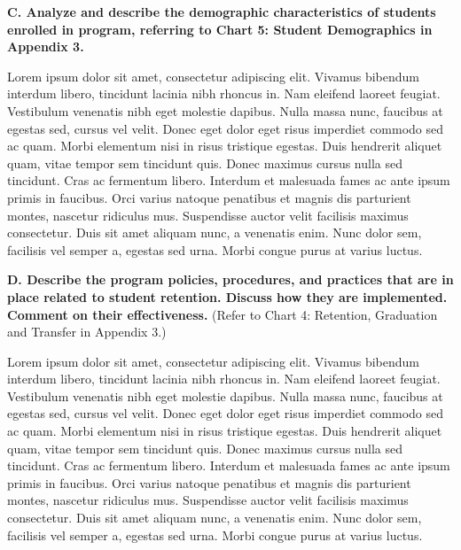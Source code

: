 \textbf{C. Analyze and describe the demographic characteristics of students enrolled in program, referring to Chart 5: Student Demographics in Appendix 3.}

Lorem ipsum dolor sit amet, consectetur adipiscing elit. Vivamus bibendum interdum libero, tincidunt lacinia nibh rhoncus in. Nam eleifend laoreet feugiat. Vestibulum venenatis nibh eget molestie dapibus. Nulla massa nunc, faucibus at egestas sed, cursus vel velit. Donec eget dolor eget risus imperdiet commodo sed ac quam. Morbi elementum nisi in risus tristique egestas. Duis hendrerit aliquet quam, vitae tempor sem tincidunt quis. Donec maximus cursus nulla sed tincidunt. Cras ac fermentum libero. Interdum et malesuada fames ac ante ipsum primis in faucibus. Orci varius natoque penatibus et magnis dis parturient montes, nascetur ridiculus mus. Suspendisse auctor velit facilisis maximus consectetur. Duis sit amet aliquam nunc, a venenatis enim. Nunc dolor sem, facilisis vel semper a, egestas sed urna. Morbi congue purus at varius luctus. 

\textbf{D. Describe the program policies, procedures, and practices that are in place related to student retention. Discuss how they are implemented. Comment on their effectiveness.}
(Refer to Chart 4: Retention, Graduation and Transfer in Appendix 3.)

Lorem ipsum dolor sit amet, consectetur adipiscing elit. Vivamus bibendum interdum libero, tincidunt lacinia nibh rhoncus in. Nam eleifend laoreet feugiat. Vestibulum venenatis nibh eget molestie dapibus. Nulla massa nunc, faucibus at egestas sed, cursus vel velit. Donec eget dolor eget risus imperdiet commodo sed ac quam. Morbi elementum nisi in risus tristique egestas. Duis hendrerit aliquet quam, vitae tempor sem tincidunt quis. Donec maximus cursus nulla sed tincidunt. Cras ac fermentum libero. Interdum et malesuada fames ac ante ipsum primis in faucibus. Orci varius natoque penatibus et magnis dis parturient montes, nascetur ridiculus mus. Suspendisse auctor velit facilisis maximus consectetur. Duis sit amet aliquam nunc, a venenatis enim. Nunc dolor sem, facilisis vel semper a, egestas sed urna. Morbi congue purus at varius luctus. 
